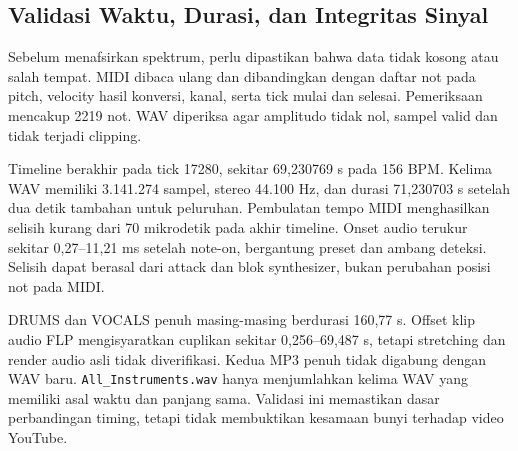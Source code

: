 \subsection{Validasi Waktu, Durasi, dan Integritas Sinyal}
Sebelum menafsirkan spektrum, perlu dipastikan bahwa data tidak kosong
atau salah tempat. MIDI dibaca ulang dan dibandingkan dengan daftar
not pada pitch, velocity hasil konversi, kanal, serta tick mulai dan
selesai. Pemeriksaan mencakup 2219 not. WAV diperiksa agar amplitudo
tidak nol, sampel valid dan tidak terjadi clipping.
\begin{table}[H]
\centering\small
\caption{Data not dan waktu aktivitasnya. Titik pada tabel numerik
digunakan sebagai pemisah desimal.}\label{tab:dataset}

\end{table}
Timeline berakhir pada tick 17280, sekitar 69,230769 s pada 156 BPM.
Kelima WAV memiliki 3.141.274 sampel, stereo 44.100 Hz, dan durasi
71,230703 s setelah dua detik tambahan untuk peluruhan. Pembulatan
tempo MIDI menghasilkan selisih kurang dari 70 mikrodetik pada akhir
timeline. Onset audio terukur sekitar 0,27--11,21 ms setelah note-on,
bergantung preset dan ambang deteksi. Selisih dapat berasal dari
attack dan blok synthesizer, bukan perubahan posisi not pada MIDI.

DRUMS dan VOCALS penuh masing-masing berdurasi 160,77 s. Offset klip
audio FLP mengisyaratkan cuplikan sekitar 0,256--69,487 s, tetapi
stretching dan render audio asli tidak diverifikasi. Kedua MP3 penuh
tidak digabung dengan WAV baru. \texttt{All\_Instruments.wav} hanya
menjumlahkan kelima WAV yang memiliki asal waktu dan panjang sama.
Validasi ini memastikan dasar perbandingan timing, tetapi tidak
membuktikan kesamaan bunyi terhadap video YouTube.

